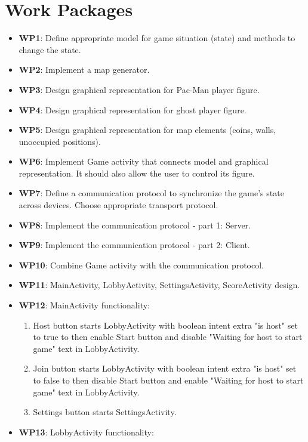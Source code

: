 \documentclass{report}
\begin{document}
\section{Work Packages}


\begin{itemize}
	\item {\bf WP1}: Define appropriate model for game situation (state) and methods to change the state.
	\item {\bf WP2}: Implement a map generator.         
	\item {\bf WP3}: Design graphical representation for Pac-Man player figure.
	\item {\bf WP4}: Design graphical representation for ghost player figure.
	\item {\bf WP5}: Design graphical representation for map elements (coins, walls, unoccupied positions).
	\item {\bf WP6}: Implement Game activity that connects model and graphical representation. It should also allow the user to control its figure.
	\item {\bf WP7}: Define a communication protocol to synchronize the game's state across devices. Choose appropriate transport protocol.
	\item {\bf WP8}: Implement the communication protocol - part 1: Server.
	\item {\bf WP9}: Implement the communication protocol - part 2: Client.
	\item {\bf WP10}: Combine Game activity with the communication protocol.
	\item {\bf WP11}: MainActivity, LobbyActivity, SettingsActivity, ScoreActivity design.
	\item {\bf WP12}: MainActivity functionality:
		\begin{enumerate}
			\item Host button starts LobbyActivity with boolean intent extra "is host" set to true to then enable Start button and disable "Waiting for host to start game" text in LobbyActivity.
			\item Join button starts LobbyActivity with boolean intent extra "is host" set to false to then disable Start button and enable "Waiting for host to start game" text in LobbyActivity.
			\item Settings button starts SettingsActivity.
		\end{enumerate}
	\item {\bf WP13}: LobbyActivity functionality:

\end{itemize}
\end{document}
